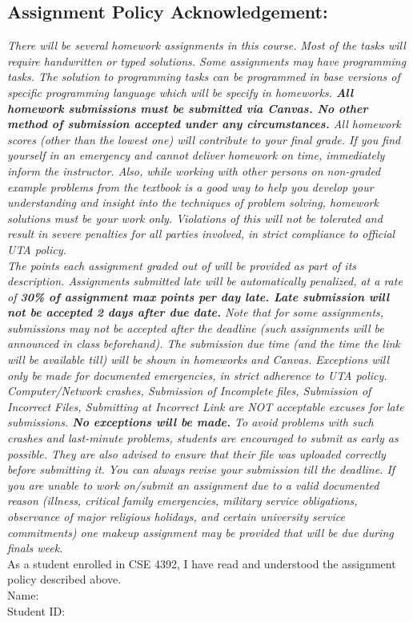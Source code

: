 \documentclass{article}
\begin{document}
\subsection*{Assignment Policy Acknowledgement:}
\textit{There will be several homework assignments in this course. Most of the tasks will require
handwritten or typed solutions. Some assignments may have programming tasks. The solution to
programming tasks can be programmed in base versions of specific programming language which will be specify in homeworks. 
\textbf{All homework submissions must be submitted via Canvas. No other method of
submission accepted under any circumstances.} All homework scores (other than the lowest
one) will contribute to your final grade. If you find yourself in an emergency and cannot deliver
homework on time, immediately inform the instructor. Also, while working with other persons on
non-graded example problems from the textbook is a good way to help you develop your
understanding and insight into the techniques of problem solving, homework solutions must be
your work only. Violations of this will not be tolerated and result in severe penalties for all parties
involved, in strict compliance to official UTA policy.}\\
\newline
\textit{The points each assignment graded out of will be provided as part of its description. Assignments
submitted late will be automatically penalized, at a rate of \textbf{30\% of assignment max points per
day late. Late submission will not be accepted 2 days after due date.} Note that for some
assignments, submissions may not be accepted after the deadline (such assignments will
be announced in class beforehand). The submission due time (and the time the link will be
available till) will be shown in homeworks and Canvas. Exceptions will only be made for documented emergencies,
in strict adherence to UTA policy. Computer/Network crashes, Submission of Incomplete files,
Submission of Incorrect Files, Submitting at Incorrect Link are NOT acceptable excuses for late
submissions. \textbf{No exceptions will be made.} To avoid problems with such crashes and last-minute
problems, students are encouraged to submit as early as possible. They are also advised to
ensure that their file was uploaded correctly before submitting it. You can always revise your
submission till the deadline. If you are unable to work on/submit an assignment due to a valid
documented reason (illness, critical family emergencies, military service obligations, observance
of major religious holidays, and certain university service commitments) one makeup assignment
may be provided that will be due during finals week.}\\
\newline
As a student enrolled in CSE 4392, I have read and understood the assignment policy
described above.\\
\newline
Name:\\
Student ID:\\
\end{document}
